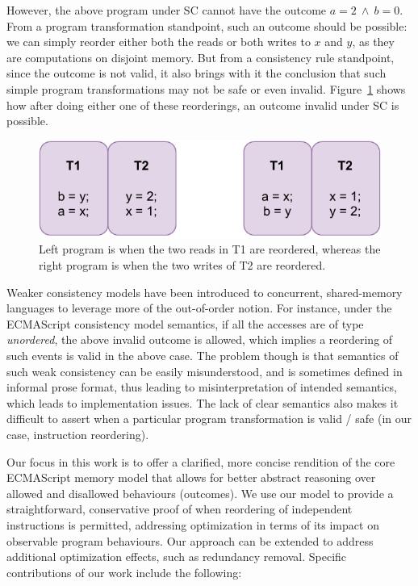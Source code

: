     
    However, the above program under SC cannot have the outcome $a=2\ \wedge\ b=0$. 
    From a program transformation standpoint, such an outcome should be possible: we can simply reorder either both the reads or both writes to $x$ and $y$, as they are computations on disjoint memory. 
    But from a consistency rule standpoint, since the outcome is not valid, it also brings with it the conclusion that such simple program transformations may not be safe or even invalid.
    Figure~\ref{intro:Example2} shows how after doing either one of these reorderings, an outcome invalid under SC is possible. 
    \begin{figure}[H]
        \centering
        \includegraphics[scale=0.7]{Program_Transform_Example.pdf}
        \caption{Left program is when the two reads in T1 are reordered, whereas the right program is when the two writes of T2 are reordered.}
        \label{intro:Example2}
    \end{figure}
    
    
    Weaker consistency models have been introduced to concurrent, shared-memory languages to leverage more of the \textit{}{out-of-order} notion. 
    For instance,  under the ECMAScript consistency model semantics, if all the accesses are of type \textit{unordered}, the above invalid outcome is allowed, which implies a reordering of such events is valid in the above case. 
    The problem though is that semantics of such weak consistency can be easily misunderstood, and is sometimes defined in informal prose format, thus leading to misinterpretation of intended semantics, which leads to implementation issues. 
    The lack of clear semantics also makes it difficult to assert when a particular program transformation is valid / safe (in our case, instruction reordering).
    
    Our focus in this work is to offer a clarified, more concise rendition of the core ECMAScript memory model that allows for better abstract reasoning over allowed and disallowed behaviours (outcomes). 
    We use our model to provide a straightforward, conservative proof of when reordering of independent instructions is permitted, addressing optimization in terms of its impact on observable program behaviours. 
    Our approach can be extended to address additional optimization effects, such as redundancy removal. Specific contributions of our work include the following:
    
